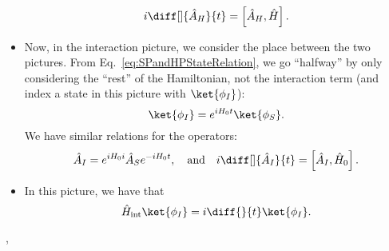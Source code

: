 \begin{itemize}
        \begin{equation}
            i \diff[]{\hat{A}_H}{t} = \left[ \hat{A}_H, \hat{H} \right].
        \end{equation}
    \item Now, in the interaction picture, we consider the place between the two pictures. From Eq.~\eqref{eq:SPandHPStateRelation}, we go ``halfway'' by only considering the ``rest'' of the Hamiltonian, not the interaction term (and index a state in this picture with $\ket{\phi_I}$):
        \begin{equation}
            \ket{\phi_I} = e^{iH_0t}\ket{\phi_S}.
        \end{equation}
        We have similar relations for the operators:
        \begin{equation}
            \hat{A}_I = e^{iH_0i} \hat{A}_S e^{-iH_0t}, \quad \mathrm{and} \quad i\diff[]{\hat{A}_I}{t} = \left[ \hat{A}_I, \hat{H}_0 \right].
        \end{equation}
    \item In this picture, we have that
        \begin{equation}
            \hat{H}_{\mathrm{int}} \ket{\phi_I} = i\diff{}{t} \ket{\phi_I}.
        \end{equation}
\end{itemize}


\sep


